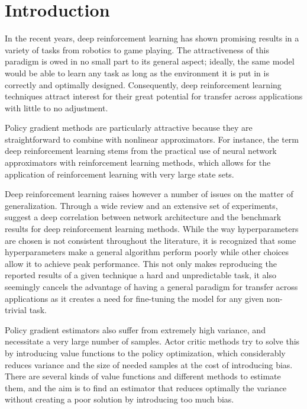 \section{Introduction}
\label{sec:intro}

In the recent years, deep reinforcement learning has shown promising results in a variety of tasks from robotics to game playing. The attractiveness of this paradigm is owed in no small part to its general aspect; ideally, the same model would be able to learn any task as long as the environment it is put in is correctly and optimally designed. Consequently, deep reinforcement learning techniques attract interest for their great potential for transfer across applications with little to no adjustment.

Policy gradient methods are particularly attractive because they are straightforward to combine with nonlinear approximators. For instance, the term deep reinforcement learning stems from the practical use of neural network approximators with reinforcement learning methods, which allows for the application of reinforcement learning with very large state sets. 



Deep reinforcement learning raises however a number of issues on the matter of generalization. Through a wide review and an extensive set of experiments, \cite{henderson2017deep} suggest a deep correlation between network architecture and the benchmark results for deep reinforcement learning methods. While the way hyperparameters are chosen is not consistent throughout the literature, it is recognized that some hyperparameters make a general algorithm perform poorly while other choices allow it to achieve peak performance. This not only makes reproducing the reported results of a given technique a hard and unpredictable task, it also seemingly cancels the advantage of having a general paradigm for transfer across applications as it creates a need for fine-tuning the model for any given non-trivial task.

Policy gradient estimators also suffer from extremely high variance, and necessitate a very large number of samples. Actor critic methods try to solve this by introducing value functions to the policy optimization, which considerably reduces variance and the size of needed samples at the cost of introducing bias. There are several kinds of value functions and different methods to estimate them, and the aim is to find an estimator that reduces optimally the variance without creating a poor solution by introducing too much bias.


